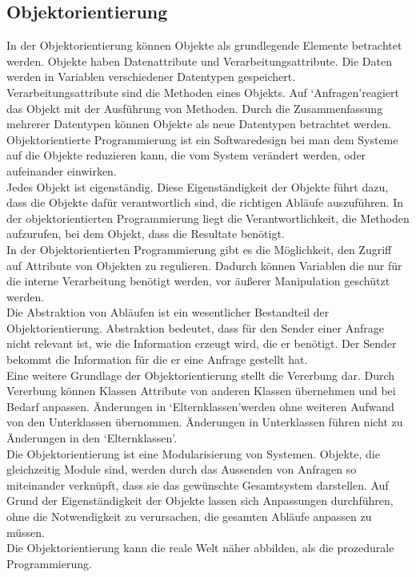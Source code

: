 \subsection{Objektorientierung}
\label{Objektorientierung}
In der Objektorientierung können Objekte als grundlegende Elemente betrachtet werden. Objekte haben Datenattribute und Verarbeitungsattribute. Die Daten werden in Variablen verschiedener Datentypen gespeichert. Verarbeitungsattribute sind die Methoden eines Objekts. Auf \lq Anfragen\rq\space reagiert das Objekt mit der Ausführung von Methoden. Durch die Zusammenfassung mehrerer Datentypen können Objekte als neue Datentypen betrachtet werden.\\
Objektorientierte Programmierung ist ein Softwaredesign bei man dem Systeme auf die Objekte reduzieren kann, die vom System verändert werden, oder aufeinander einwirken.\\
Jedes Objekt ist eigenständig. Diese Eigenständigkeit der Objekte führt dazu, dass die Objekte dafür verantwortlich sind, die richtigen Abläufe auszuführen. In der objektorientierten Programmierung liegt die Verantwortlichkeit, die Methoden aufzurufen, bei dem Objekt, dass die Resultate benötigt.\\
In der Objektorientierten Programmierung gibt es die Möglichkeit, den Zugriff auf Attribute von Objekten zu regulieren. Dadurch können Variablen die nur für die interne Verarbeitung benötigt werden, vor äußerer Manipulation geschützt werden.\\
Die Abstraktion von Abläufen ist ein wesentlicher Bestandteil der Objektorientierung. Abstraktion bedeutet, dass für den Sender einer Anfrage nicht relevant ist, wie die Information erzeugt wird, die er benötigt. Der Sender bekommt die Information für die er eine Anfrage gestellt hat. \\
Eine weitere Grundlage der Objektorientierung stellt die Vererbung dar. Durch Vererbung können Klassen Attribute von anderen Klassen übernehmen und bei Bedarf anpassen. Änderungen in \lq Elternklassen\rq\space werden ohne weiteren Aufwand von den Unterklassen übernommen. Änderungen in Unterklassen führen nicht zu Änderungen in den \lq Elternklassen\rq .\\
Die Objektorientierung ist eine Modularisierung von Systemen. Objekte, die gleichzeitig Module sind, werden durch das Aussenden von Anfragen so miteinander verknüpft, dass sie das gewünschte Gesamtsystem darstellen. Auf Grund der Eigenständigkeit der Objekte lassen sich Anpassungen durchführen, ohne die Notwendigkeit zu verursachen, die gesamten Abläufe anpassen zu müssen.\\
Die Objektorientierung kann die reale Welt näher abbilden, als die prozedurale\\ Programmierung\cite{10.1145/71605.71612}.
